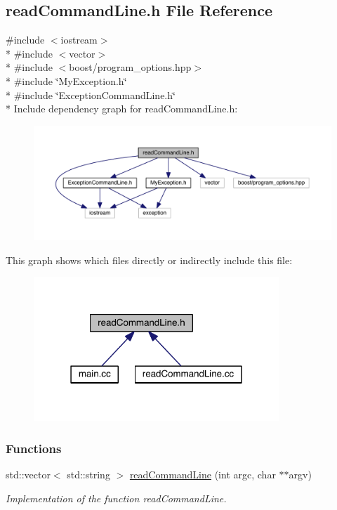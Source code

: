 \hypertarget{a00113}{}\subsection{read\+Command\+Line.\+h File Reference}
\label{a00113}
{\ttfamily \#include $<$iostream$>$}\\*
{\ttfamily \#include $<$vector$>$}\\*
{\ttfamily \#include $<$boost/program\+\_\+options.\+hpp$>$}\\*
{\ttfamily \#include \char`\"{}My\+Exception.\+h\char`\"{}}\\*
{\ttfamily \#include \char`\"{}Exception\+Command\+Line.\+h\char`\"{}}\\*
Include dependency graph for read\+Command\+Line.\+h\+:\nopagebreak
\begin{figure}[H]
\begin{center}
\leavevmode
\includegraphics[width=350pt]{a00149}
\end{center}
\end{figure}
This graph shows which files directly or indirectly include this file\+:\nopagebreak
\begin{figure}[H]
\begin{center}
\leavevmode
\includegraphics[width=262pt]{a00150}
\end{center}
\end{figure}
\subsubsection*{Functions}
\begin{DoxyCompactItemize}
\item 
std\+::vector$<$ std\+::string $>$ \hyperlink{a00113_a20e7468e7c7621b99ed5a35e29a56623}{read\+Command\+Line} (int argc, char $\ast$$\ast$argv)
\begin{DoxyCompactList}\small\item\em Implementation of the function read\+Command\+Line. \end{DoxyCompactList}\end{DoxyCompactItemize}


